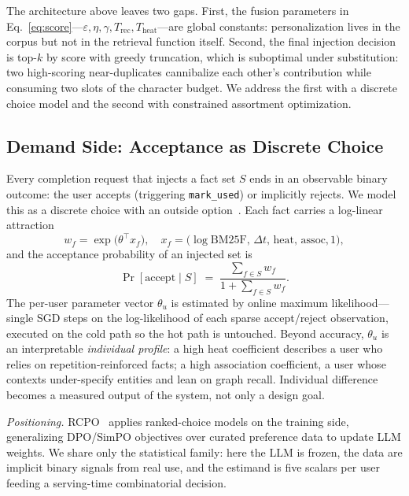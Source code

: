 \documentclass[letterpaper]{article}
\begin{document}
The architecture above leaves two gaps. First, the fusion parameters in
Eq.~\eqref{eq:score}---$\varepsilon, \eta, \gamma, T_{\mathrm{rec}},
T_{\mathrm{heat}}$---are global constants: personalization lives in the
corpus but not in the retrieval function itself. Second, the final
injection decision is top-$k$ by score with greedy truncation, which is
suboptimal under substitution: two high-scoring near-duplicates cannibalize
each other's contribution while consuming two slots of the character
budget. We address the first with a discrete choice model and the second
with constrained assortment optimization.

\subsection{Demand Side: Acceptance as Discrete Choice}

Every completion request that injects a fact set $S$ ends in an observable
binary outcome: the user accepts (triggering \texttt{mark\_used}) or
implicitly rejects. We model this as a discrete choice with an outside
option~\citep{mcfadden1974conditional}. Each fact carries a log-linear
attraction
\begin{equation}
\label{eq:utility}
w_f = \exp\!\big(\theta^{\top} x_f\big), \quad
x_f = \big(\log \mathrm{BM25F},\, \Delta t,\, \mathrm{heat},\,
\mathrm{assoc}, 1\big),
\end{equation}
and the acceptance probability of an injected set is
\begin{equation}
\label{eq:mnl}
\Pr[\text{accept} \mid S] \;=\;
\frac{\sum_{f \in S} w_f}{1 + \sum_{f \in S} w_f}.
\end{equation}
The per-user parameter vector $\theta_u$ is estimated by online maximum
likelihood---single SGD steps on the log-likelihood of each sparse
accept/reject observation, executed on the cold path so the hot path is
untouched. Beyond accuracy, $\theta_u$ is an interpretable
\emph{individual profile}: a high heat coefficient describes a user who
relies on repetition-reinforced facts; a high association coefficient, a
user whose contexts under-specify entities and lean on graph recall.
Individual difference becomes a measured output of the system, not only a
design goal.

\emph{Positioning.} RCPO~\citep{tang2026rcpo} applies ranked-choice models
on the training side, generalizing DPO/SimPO objectives over curated
preference data to update LLM weights. We share only the statistical
family: here the LLM is frozen, the data are implicit binary signals from
real use, and the estimand is five scalars per user feeding a serving-time
combinatorial decision.
\end{document}

